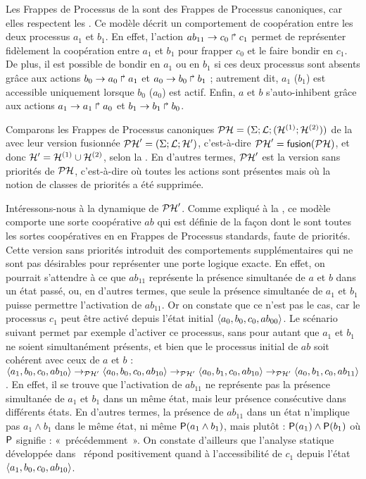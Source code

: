 \begin{example}
  Les Frappes de Processus de la 
  sont des Frappes de Processus canoniques,
  car elles respectent les \allcr.
  Ce modèle décrit un comportement de coopération entre les deux processus $a_1$ et $b_1$.
  En effet, l'action $\PHfrappe{ab_{11}}{c_0}{c_1}$
  permet de représenter fidèlement la coopération entre $a_1$ et $b_1$ pour
  frapper $c_0$ et le faire bondir en $c_1$.
  De plus, il est possible de bondir en $a_1$ ou en $b_1$ si ces deux processus sont absents
  grâce aux actions $\PHfrappe{b_0}{a_0}{a_1}$ et $\PHfrappe{a_0}{b_0}{b_1}$ ;
  autrement dit, $a_1$ (\resp $b_1$) est accessible uniquement lorsque $b_0$
  (\resp $a_0$) est actif.
  Enfin, $a$ et $b$ s'auto-inhibent grâce aux actions
  $\PHfrappe{a_1}{a_1}{a_0}$ et $\PHfrappe{b_1}{b_1}{b_0}$.
  
  Comparons les Frappes de Processus canoniques $\PH = (\PHs; \PHl; (\PHa^{(1)}; \PHa^{(2)}))$
  de la  avec leur version fusionnée $\PH' = (\PHs; \PHl; \PHh')$,
  c'est-à-dire $\PH' = \PHmerge(\PH)$, et donc $\PHh' = \PHh^{(1)} \cup \PHh^{(2)}$,
  selon la .
  En d'autres termes, $\PH'$ est la version sans priorités de $\PH$,
  c'est-à-dire où toutes les actions sont présentes mais où la notion de classes de priorités
  a été supprimée.
  
  Intéressons-nous à la dynamique de $\PH'$.
  Comme expliqué à la ,
  ce modèle comporte une sorte coopérative $ab$ qui est définie de la façon
  dont le sont toutes les sortes coopératives en
  en Frappes de Processus standards, faute de priorités.
  Cette version sans priorités introduit des comportements supplémentaires qui ne sont pas
  désirables pour représenter une porte logique exacte.
  En effet, on pourrait s'attendre à ce que $ab_{11}$ représente la présence simultanée
  de $a$ et $b$ dans un état passé,
  ou, en d'autres termes, que seule la présence simultanée de $a_1$ et $b_1$ puisse
  permettre l'activation de $ab_{11}$.
  Or on constate que ce n'est pas le cas, car le processus $c_1$ peut être
  activé depuis l'état initial $\etat{a_0, b_0, c_0, ab_{00}}$.
  Le scénario suivant permet par exemple d'activer
  ce processus, sans pour autant que $a_1$ et $b_1$ ne soient simultanément présents,
  et bien que le processus initial de $ab$ soit cohérent avec ceux de $a$ et $b$ :
  $\PHstate{a_1, b_0, c_0, ab_{10}} \PHtrans[\PH']
  \PHstate{a_0, b_0, c_0, ab_{10}} \PHtrans[\PH']
  \PHstate{a_0, b_1, c_0, ab_{10}} \PHtrans[\PH']
  \PHstate{a_0, b_1, c_0, ab_{11}}$.
  En effet, il se trouve que l'activation de $ab_{11}$ ne représente pas la présence simultanée
  de $a_1$ et $b_1$ dans un même état, mais leur présence consécutive dans
  différents états.
  En d'autres termes, la présence de $ab_{11}$ dans un état n'implique pas
  $a_1 \wedge b_1$ dans le même état, ni même
  $\tempop(a_1 \wedge b_1)$, mais plutôt : $\tempop(a_1) \wedge \tempop(b_1)$
  où $\tempop$ signifie : «~précédemment~».
  On constate d'ailleurs que l'analyse statique développée dans~\cite{PMR12-MSCS}
  répond positivement quand à l'accessibilité de $c_1$ depuis l'état
  $\PHstate{a_1, b_0, c_0, ab_{10}}$.
  

\end{example}
